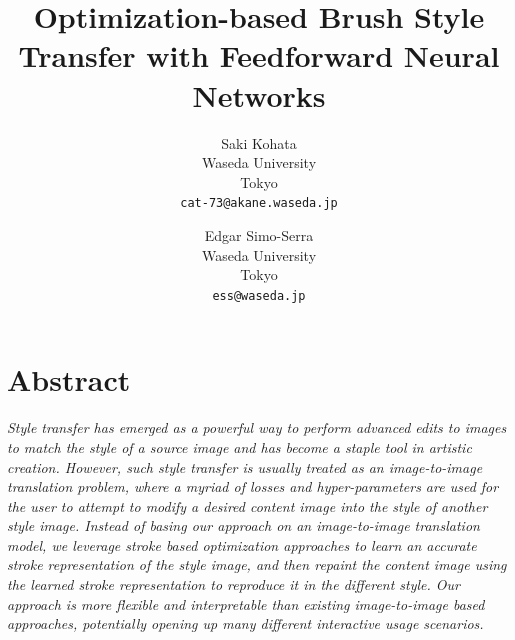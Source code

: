 \documentclass{mva_style}
\begin{document}
\title{Optimization-based Brush Style Transfer with Feedforward Neural Networks}

\author{
  Saki Kohata\\
  Waseda University\\
  Tokyo\\
  {\tt cat-73@akane.waseda.jp}\\
  \and
  Edgar Simo-Serra\\
  Waseda University\\
  Tokyo\\
  {\tt ess@waseda.jp}\\
}

\maketitle

\section*{\centering Abstract}
\textit{
Style transfer has emerged as a powerful way to perform advanced edits to
images to match the style of a source image and has become a staple tool in
artistic creation. However, such style transfer is usually treated as an
image-to-image translation problem, where a myriad of losses and
hyper-parameters are used for the user to attempt to modify a desired content
image into the style of another style image.
Instead of basing our approach on an image-to-image translation model, we
leverage stroke based optimization approaches to learn an accurate stroke
representation of the style image, and then repaint the content image using the
learned stroke representation to reproduce it in the different style.
Our approach is more flexible and interpretable than existing image-to-image
based approaches, potentially opening up many different interactive usage
scenarios.
}
\end{document}
